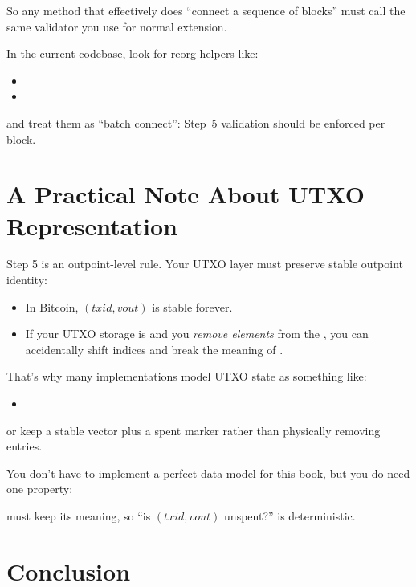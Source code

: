 So any method that effectively does ``connect a sequence of blocks'' must call the same validator you use for normal extension.

In the current codebase, look for reorg helpers like:

\begin{itemize}
  \item {}
  \item {}
\end{itemize}

and treat them as ``batch connect'': Step~5 validation should be enforced per block.

\section{A Practical Note About UTXO Representation}
\label{sec:ch10-utxo-representation}

Step 5 is an outpoint-level rule. Your UTXO layer must preserve stable outpoint identity:

\begin{itemize}
  \item In Bitcoin, $(txid, vout)$ is stable forever.
  \item If your UTXO storage is  and you \emph{remove elements} from the , you can accidentally shift indices and break the meaning of .
\end{itemize}

That's why many implementations model UTXO state as something like:

\begin{itemize}
  \item {}
\end{itemize}

or keep a stable vector plus a spent marker rather than physically removing entries.

You don't have to implement a perfect data model for this book, but you do need one property:

\begin{notebox}
 must keep its meaning, so ``is $(txid, vout)$ unspent?'' is deterministic.
\end{notebox}

\section{Conclusion}
\label{sec:ch10-conclusion}

